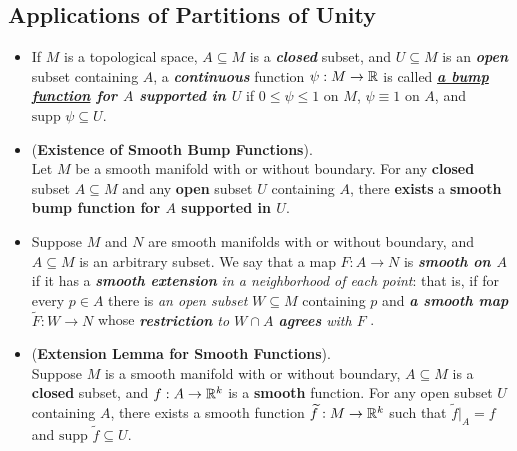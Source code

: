 \documentclass[11pt]{article}
\begin{document}
\subsection{Applications of Partitions of Unity}
\begin{itemize}
\item \begin{definition}
If $M$ is a topological space, $A \subseteq M$ is a \textbf{\emph{closed}} subset, and $U \subseteq M$ is an \textbf{\emph{open}} subset containing $A$, a \emph{\textbf{continuous}} function $\psi: M \rightarrow {\mathbb R}$ is called \emph{\textbf{\underline{a bump function} for $A$ supported in $U$}} if $0\le \psi \le 1$ on $M$, $\psi \equiv
1$ on $A$, and $\text{supp }\psi \subseteq U$.
\end{definition}

\item \begin{proposition} (\textbf{Existence of Smooth Bump Functions}).   \citep{lee2003introduction}\\
Let $M$ be a smooth manifold with or without boundary. For any \textbf{closed} subset $A\subseteq M$ and any \textbf{open} subset $U$ containing $A$, there \textbf{exists} a \textbf{smooth bump function for $A$ supported in $U$}.
\end{proposition}

\item \begin{definition}
Suppose $M$ and $N$ are smooth manifolds with or without boundary, and $A \subseteq M$ is an arbitrary subset. We say that a map $F:A \rightarrow N$ is \emph{\textbf{smooth on $A$}} if it has a \emph{\textbf{smooth extension}} \emph{in a neighborhood of each point}: that is, if for every $p \in A$ there is \emph{an open subset} $W \subseteq M$ containing $p$ and \emph{\textbf{a smooth map}} $\widetilde{F}: W \rightarrow N$ whose \emph{\textbf{restriction} to $W \cap A$ \textbf{agrees} with $F$} .
\end{definition}

\item \begin{lemma} (\textbf{Extension Lemma for Smooth Functions}).  \citep{lee2003introduction} \\
Suppose $M$ is a smooth manifold with or without boundary, $A \subseteq M$ is a \textbf{closed} subset, and $f: A \rightarrow {\mathbb R}^k$ is a
\textbf{smooth} function. For any open subset $U$ containing $A$, there exists a smooth function $\widetilde{f}: M \rightarrow {\mathbb R}^k$ such that $\widetilde{f}|_{A} = f$ and $\text{supp }\widetilde{f} \subseteq U$.
\end{lemma}


\end{itemize}
\end{document}
